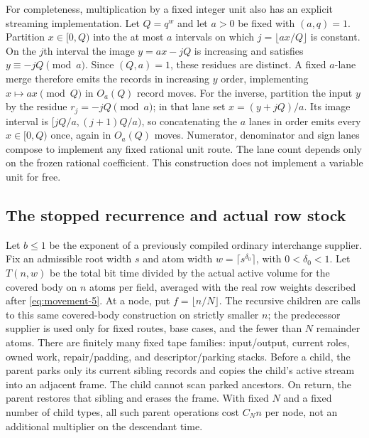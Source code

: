 For completeness, multiplication by a fixed integer unit also has an
explicit streaming implementation. Let $Q=q^w$ and let $a>0$ be fixed
with $(a,q)=1$. Partition $x\in[0,Q)$ into the at most $a$ intervals on
which $j=\lfloor ax/Q\rfloor$ is constant. On the $j$th interval the
image $y=ax-jQ$ is increasing and satisfies $y\equiv-jQ\pmod a$.
Since $(Q,a)=1$, these residues are distinct. A fixed $a$-lane merge
therefore emits the records in increasing $y$ order, implementing
$x\mapsto ax\pmod Q$ in $O_a(Q)$ record moves. For the inverse, partition
the input $y$ by the residue
$r_j=-jQ\pmod a$; in that lane set $x=(y+jQ)/a$. Its image interval is
$[jQ/a,(j+1)Q/a)$, so concatenating the $a$ lanes in order emits every
$x\in[0,Q)$ once, again in $O_a(Q)$ moves. Numerator, denominator and
sign lanes compose to implement any fixed rational unit route. The lane
count depends only on the frozen rational coefficient. This construction
does not implement a variable unit for free.

\subsection{The stopped recurrence and actual row stock}

Let $b\le1$ be the exponent of a previously compiled ordinary
interchange supplier. Fix an admissible root width $s$ and atom width
$w=\lceil s^{\delta_0}\rceil$, with $0<\delta_0<1$. Let $T(n,w)$ be
the total bit time divided by the actual active volume for the covered
body on $n$ atoms per field, averaged with the real row weights described
after \eqref{eq:movement-5}. At a node, put $f=\lfloor n/N\rfloor$. The recursive children
are calls to this same covered-body construction on strictly smaller
$n$; the predecessor supplier is used only for fixed routes, base cases,
and the fewer than $N$ remainder atoms. There are finitely many fixed
tape families: input/output, current roles, owned work, repair/padding,
and descriptor/parking stacks. Before a child, the parent parks only its
current sibling records and copies the child's active stream into an
adjacent frame. The child cannot scan parked ancestors. On return, the
parent restores that sibling and erases the frame. With fixed $N$ and a
fixed number of child types, all such parent operations cost $C_Nn$ per
node, not an additional multiplier on the descendant time.

